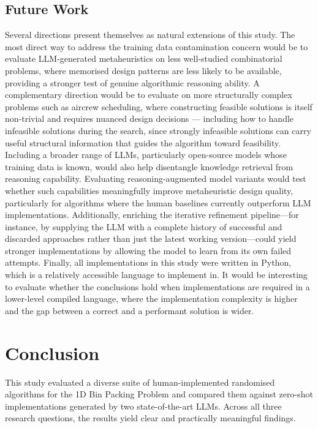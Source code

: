 \documentclass[11pt]{article}
\begin{document}
\subsection{Future Work}
Several directions present themselves as natural extensions of this study. The most
direct way to address the training data contamination concern would be to evaluate
LLM-generated metaheuristics on less well-studied combinatorial problems, where
memorised design patterns are less likely to be available, providing a stronger test of
genuine algorithmic reasoning ability. A complementary direction would be to evaluate
on more structurally complex problems such as aircrew scheduling, where constructing
feasible solutions is itself non-trivial and requires nuanced design decisions ---
including how to handle infeasible solutions during the search, since strongly
infeasible solutions can carry useful structural information that guides the algorithm
toward feasibility. Including a broader range of LLMs, particularly open-source models
whose training data is known, would also help disentangle knowledge retrieval from
reasoning capability. Evaluating reasoning-augmented model variants would test whether such capabilities meaningfully improve metaheuristic design quality, particularly for algorithms where the human baselines currently outperform LLM implementations. Additionally, enriching the iterative refinement pipeline---for instance, by supplying the LLM with a complete history of successful and discarded approaches rather than just the latest working version---could yield stronger implementations by allowing the model to learn from its own failed attempts. Finally, all implementations in this study were written in
Python, which is a relatively accessible language to implement in. It would be
interesting to evaluate whether the conclusions hold when implementations are required
in a lower-level compiled language, where the implementation complexity is higher and
the gap between a correct and a performant solution is wider.

\section{Conclusion}
This study evaluated a diverse suite of human-implemented randomised algorithms for
the 1D Bin Packing Problem and compared them against zero-shot implementations
generated by two state-of-the-art LLMs. Across all three research questions, the
results yield clear and practically meaningful findings.
\end{document}
